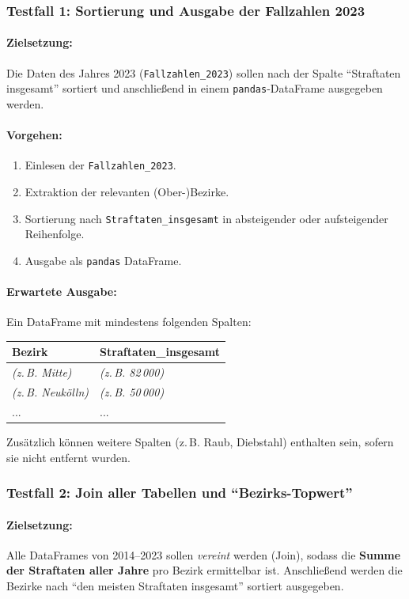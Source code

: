 \documentclass[11pt,a4paper]{article}
\begin{document}
\subsubsection{Testfall 1: Sortierung und Ausgabe der Fallzahlen 2023}
\label{subsec:tf1}
\paragraph{Zielsetzung:}
Die Daten des Jahres 2023 (\texttt{Fallzahlen\_2023}) sollen nach der Spalte \enquote{Straftaten insgesamt} sortiert und anschließend in einem \texttt{pandas}-DataFrame ausgegeben werden.

\paragraph{Vorgehen:}
\begin{enumerate}
    \item Einlesen der \texttt{Fallzahlen\_2023}.
    \item Extraktion der relevanten (Ober-)Bezirke.
    \item Sortierung nach \texttt{Straftaten\_insgesamt} in absteigender oder aufsteigender Reihenfolge.
    \item Ausgabe als \texttt{pandas} DataFrame.
\end{enumerate}

\paragraph{Erwartete Ausgabe:}
Ein DataFrame mit mindestens folgenden Spalten:
\begin{center}
\begin{tabular}{l|l}
\textbf{Bezirk} & \textbf{Straftaten\_insgesamt} \\
\hline
\textit{(z.\,B. Mitte)} & \textit{(z.\,B. 82\,000)} \\
\textit{(z.\,B. Neukölln)} & \textit{(z.\,B. 50\,000)} \\
... & ...
\end{tabular}
\end{center}
Zusätzlich können weitere Spalten (z.\,B. Raub, Diebstahl) enthalten sein, sofern sie nicht entfernt wurden.

\subsubsection{Testfall 2: Join aller Tabellen und \enquote{Bezirks-Topwert}}
\paragraph{Zielsetzung:}
Alle DataFrames von 2014--2023 sollen \emph{vereint} werden (Join), sodass die \textbf{Summe der Straftaten aller Jahre} pro Bezirk ermittelbar ist. Anschließend werden die Bezirke nach \enquote{den meisten Straftaten insgesamt} sortiert ausgegeben.
\end{document}
